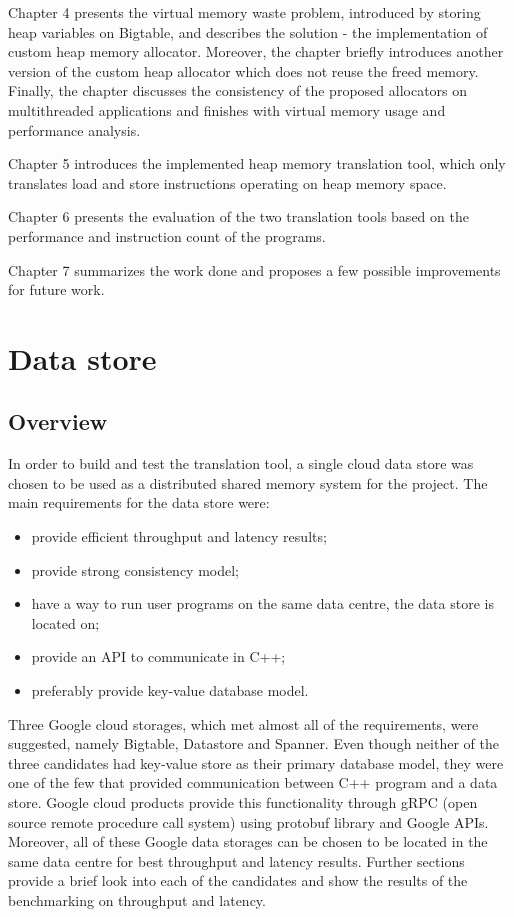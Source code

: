 \documentclass[bsc,frontabs,twoside,singlespacing,parskip,deptreport]{infthesis}     %
\begin{document}
Chapter 4 presents the virtual memory waste problem, introduced by storing heap variables on Bigtable, and describes the solution - the implementation of custom heap memory allocator. Moreover, the chapter briefly introduces another version of the custom heap allocator which does not reuse the freed memory. Finally, the chapter discusses the consistency of the proposed allocators on multithreaded applications and finishes with virtual memory usage and performance analysis.

Chapter 5 introduces the implemented heap memory translation tool, which only translates load and store instructions operating on heap memory space.

Chapter 6 presents the evaluation of the two translation tools based on the performance and instruction count of the programs.

Chapter 7 summarizes the work done and proposes a few possible improvements for future work.

\chapter{Data store}

\section{Overview}

In order to build and test the translation tool, a single cloud data store was chosen to be used as a distributed shared memory system for the project. The main requirements for the data store were:

\begin{itemize}
\item
provide efficient throughput and latency results;
\item
provide strong consistency model;
\item
have a way to run user programs on the same data centre, the data store is located on;
\item
provide an API to communicate in C++;
\item
preferably provide key-value database model.
\end{itemize}

Three Google cloud storages, which met almost all of the requirements, were suggested, namely Bigtable, Datastore and Spanner. Even though neither of the three candidates had key-value store as their primary database model, they were one of the few that provided communication between C++ program and a data store. Google cloud products provide this functionality through gRPC (open source remote procedure call system) using protobuf library and Google APIs. Moreover, all of these Google data storages can be chosen to be located in the same data centre for best throughput and latency results. Further sections provide a brief look into each of the candidates and show the results of the benchmarking on throughput and latency.
\end{document}
